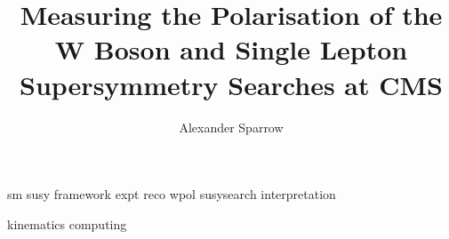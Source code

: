 \documentclass{mythesis}
\title{Measuring the Polarisation of the W Boson and Single Lepton Supersymmetry Searches at CMS} \author{Alexander Sparrow}
\begin{document}


\begin{frontmatter}
  
\end{frontmatter}
\begin{mainmatter}
  \linenumbers
  {sm}
  {susy}
  {framework}
  {expt}
  {reco}
  {wpol}
  {susysearch}
  {interpretation}

  \nolinenumbers
\end{mainmatter}

\begin{comment}
  
  
  
  
  
  
  
  
\end{comment}

\begin{appendices}
  {kinematics}
  {computing}
\end{appendices}

\begin{comment}
  
  
\end{comment}

\begin{backmatter}
  
\end{backmatter}

\end{document}
